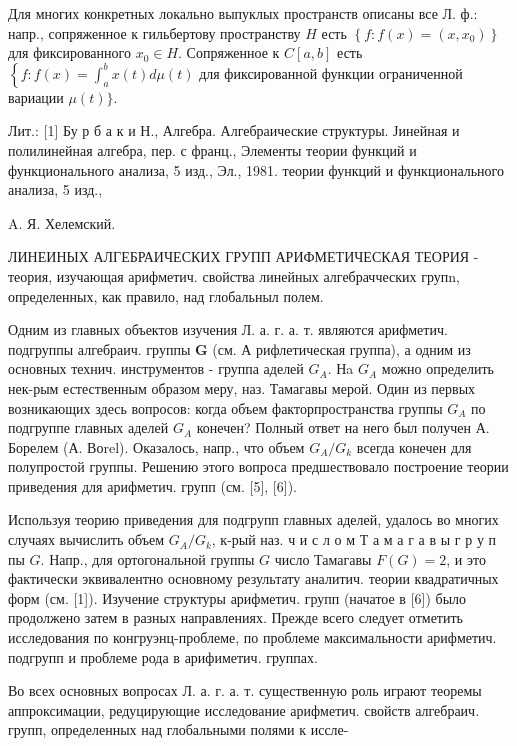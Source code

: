 \documentclass[10pt]{article}
\begin{document}
Для многих конкретных локально выпуклых пространств описаны все Л. ф.: напр., сопряженное к гильбертову пространству $H$ есть $\left\{f: f(x)=\left(x, x_{0}\right)\right\}$ для фиксированного $x_{0} \in H$. Сопряженное к $C[a, b]$ есть $\left\{f: f(x)=\int_{a}^{b} x(t) d \mu(t)\right.$ для фиксированной функции ограниченной вариации $\mu(t)\}$.



Лит.: [1] Бу р б а к и Н., Алгебра. Алгебраические структуры. Јинейная и полилинейная алгебра, пер. с франц., Элементы теории функций и функционального анализа, 5 изд., Эл., 1981. теории функций и функционального анализа, 5 изд.,

A. Я. Хелемский.



ЛИНЕИНЫХ АЛГЕБРАИЧЕСКИХ ГРУПП АРИФМЕТИЧЕСКАЯ ТЕОРИЯ - теория, изучающая арифметич. свойства линейных алгебрачческих групn, определенных, как правило, над глобальныл полем.



Одним из главных объектов изучения Л. а. г. а. т. являются арифметич. подгруппы алгебраич. группы $\boldsymbol{G}$ (см. А рифлетическая группа), а одним из основных технич. инструментов - группа аделей $G_{A}$. Нa $G_{A}$ можно определить нек-рым естественным образом меру, наз. Тамагавы мерой. Один из первых возникающих здесь вопросов: когда объем факторпространства группы $G_{A}$ по подгруппе главных аделей $G_{A}$ конечен? Полный ответ на него был получен А. Борелем (А. Воrel). Оказалось, напр., что объем $G_{A} / G_{k}$ всегда конечен для полупростой группы. Решению этого вопроса предшествовало построение теории приведения для арифметич. групп (см. [5], [6]).



Используя теорию приведения для подгрупп главных аделей, удалось во многих случаях вычислить объем $G_{A} / G_{k}$, к-рый наз. ч и с л о м Т а м а г а в ы г р у п пы $G$. Напр., для ортогональной группы $G$ число Тамагавы $F(G)=2$, и это фактически эквивалентно основному результату аналитич. теории квадратичных форм (см. [1]). Изучение структуры арифметич. групп (начатое в [6]) было продолжено затем в разных направлениях. Прежде всего следует отметить исследования по конгруэнц-проблеме, по проблеме максимальности арифметич. подгрупп и проблеме рода в арифиметич. группах.



Во всех основных вопросах Л. а. г. а. т. существенную роль играют теоремы аппроксимации, редуцирующие исследование арифметич. свойств алгебраич. групп, определенных над глобальными полями к иссле-
\end{document}
